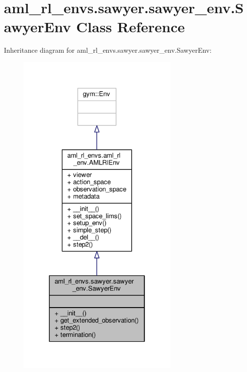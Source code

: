 \hypertarget{classaml__rl__envs_1_1sawyer_1_1sawyer__env_1_1_sawyer_env}{\section{aml\-\_\-rl\-\_\-envs.\-sawyer.\-sawyer\-\_\-env.\-Sawyer\-Env Class Reference}
\label{classaml__rl__envs_1_1sawyer_1_1sawyer__env_1_1_sawyer_env}
}


Inheritance diagram for aml\-\_\-rl\-\_\-envs.\-sawyer.\-sawyer\-\_\-env.\-Sawyer\-Env\-:
\nopagebreak
\begin{figure}[H]
\begin{center}
\leavevmode
\includegraphics[width=226pt]{classaml__rl__envs_1_1sawyer_1_1sawyer__env_1_1_sawyer_env__inherit__graph}
\end{center}
\end{figure}


